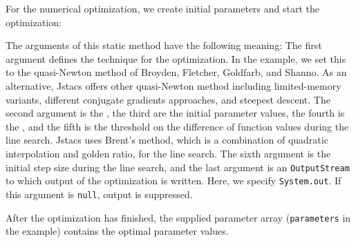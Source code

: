 For the numerical optimization, we create initial parameters and start the optimization:
\addtocounter{off}{3}
The arguments of this static method have the following meaning:
The first argument defines the technique for the optimization. In the example, we set this to the quasi-Newton method of Broyden, Fletcher, Goldfarb, and Shanno. As an alternative, Jstacs offers other quasi-Newton method including limited-memory variants, different conjugate gradients approaches, and steepest descent.
The second argument is the \DifferentiableFunction, the third are the initial parameter values, the fourth is the \TerminationCondition, and the fifth is the threshold on the difference of function values during the line search. Jstacs uses Brent's method, which is a combination of quadratic interpolation and golden ratio, for the line search. The sixth argument is the initial step size during the line search, and the last argument is an \lstinline+OutputStream+ to which output of the optimization is written. Here, we specify \lstinline+System.out+. If this argument is \lstinline+null+, output is suppressed.

After the optimization has finished, the supplied parameter array (\lstinline+parameters+ in the example) contains the optimal parameter values.

